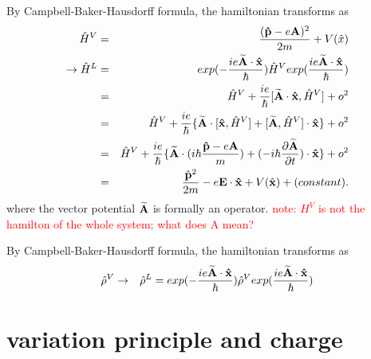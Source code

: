 \documentclass[aps,prb,preprint]{revtex4-1}
\begin{document}
\begin{appendix}
By Campbell-Baker-Hausdorff formula, the hamiltonian transforms as  
\begin{eqnarray}
\hat{H}^V &=& \frac{ ({\bf \hat{p}} - e{\bf A})^2 }{2m} + V(\hat{x}) \nonumber \nonumber \\ 
\rightarrow \hat{H}^L &=& exp(-\frac{ i e {\bf \widetilde{A} \cdot \hat{x}} }{\hbar}) \hat{H}^V exp( \frac{ i e {\bf \widetilde{A} \cdot \hat{x}}}{\hbar}) \nonumber \\
&=& \hat{H}^V + \frac{i e}{\hbar}[{\bf \widetilde{A} \cdot \hat{x} }, \hat{H}^V] + o^2 \nonumber \\
&=& \hat{H}^V + \frac{i e}{\hbar} \{ {\bf \widetilde{A}} \cdot [ {\bf \hat{x} }, \hat{H}^V] + [ {\bf \widetilde{A}} , \hat{H}^V] \cdot {\bf \hat{x} } \}+ o^2 \nonumber \\
&=& \hat{H}^V + \frac{i e}{\hbar} \{ {\bf \widetilde{A}} \cdot (i \hbar \frac{{\bf \hat{p}} - e{\bf A}}{m}) + (- i \hbar \frac{\partial \widetilde{\bf A}}{\partial t}) \cdot {\bf \hat{x} } \}+ o^2 \nonumber \\
&=& \frac{ \hat{\bf p}^2 }{2m} -e {\bf E \cdot \hat{\bf x}} + V(\hat{\bf x})+ (constant).\nonumber \\
\end{eqnarray} 
where the vector potential ${\bf \widetilde{A}}$ is formally an operator. 
\textcolor{red}{note: $H^V$ is not the hamilton of the whole system; what does A mean?}

By Campbell-Baker-Hausdorff formula, the hamiltonian transforms as  
\begin{eqnarray}
\hat{\rho}^V &\rightarrow& \hat{\rho}^L =exp(-\frac{ i e {\bf \widetilde{A} \cdot \hat{x}} }{\hbar}) \hat{\rho}^V exp( \frac{ i e {\bf \widetilde{A} \cdot \hat{x}}}{\hbar}) \nonumber \\
\end{eqnarray} 

\section{variation principle and charge}


\end{appendix}
\end{document}
